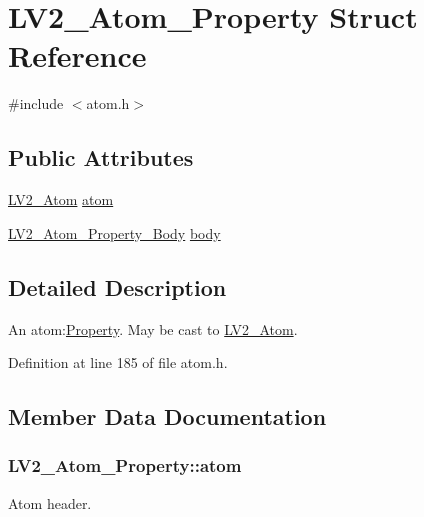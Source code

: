\hypertarget{struct_l_v2___atom___property}{}\section{L\+V2\+\_\+\+Atom\+\_\+\+Property Struct Reference}
\label{struct_l_v2___atom___property}


{\ttfamily \#include $<$atom.\+h$>$}

\subsection*{Public Attributes}
\begin{DoxyCompactItemize}
\item 
\hyperlink{struct_l_v2___atom}{L\+V2\+\_\+\+Atom} \hyperlink{struct_l_v2___atom___property_a0ba7a71071f6fb5a6c06add95b4b2e47}{atom}
\item 
\hyperlink{struct_l_v2___atom___property___body}{L\+V2\+\_\+\+Atom\+\_\+\+Property\+\_\+\+Body} \hyperlink{struct_l_v2___atom___property_aada219d60860f04041f473ea21a8fdfd}{body}
\end{DoxyCompactItemize}


\subsection{Detailed Description}
An atom\+:\hyperlink{struct_property}{Property}. May be cast to \hyperlink{struct_l_v2___atom}{L\+V2\+\_\+\+Atom}. 

Definition at line 185 of file atom.\+h.



\subsection{Member Data Documentation}
\subsubsection[{\texorpdfstring{atom}{atom}}]{ L\+V2\+\_\+\+Atom\+\_\+\+Property\+::atom}\hypertarget{struct_l_v2___atom___property_a0ba7a71071f6fb5a6c06add95b4b2e47}{}\label{struct_l_v2___atom___property_a0ba7a71071f6fb5a6c06add95b4b2e47}
Atom header. 

